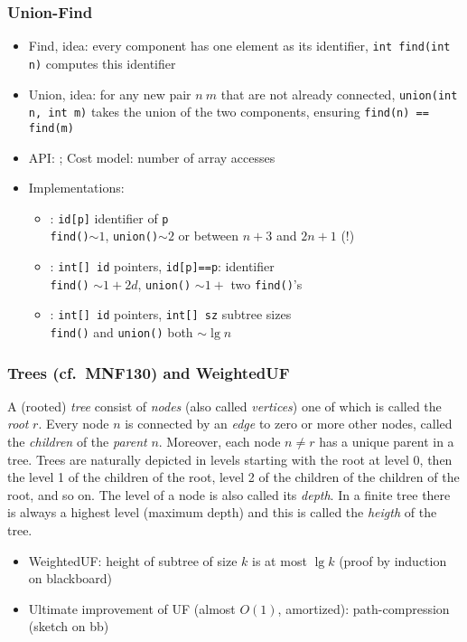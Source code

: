 \documentclass[handout]{beamer}
\newcommand{\git}{https://github.com/marcbezem/INF102/blob/master}
\begin{document}
\frame
  {
    
    \frametitle{Union-Find}

\begin{itemize}[<+->]
\item Find, idea: every component has one element as its identifier, 
 {\tt int  find(int n)} computes this identifier
\item Union, idea: for any new pair $n~m$ that are not already connected, 
{\tt union(int n, int m)} takes the union of the two components, ensuring
{\tt find(n) == find(m)}
\item API: \href{http://algs4.cs.princeton.edu/code/javadoc}{{\color{red}{UF}}};
Cost model: number of array accesses
\item Implementations:
  \begin{itemize}
  \item \href{\git/programs/fundamentals/unionFind/SlowUF.java}%
{\color{red}{SlowUF.java}}: {\tt id[p]} identifier of {\tt p}\\
{\tt find()}$\sim1$, {\tt union()}$\sim 2$ or between $n{+}3$ and $2n{+}1$ (!)
  \item \href{\git/programs/fundamentals/unionFind/FastUF.java}%
{\color{red}{FastUF.java}}: {\tt int[] id} pointers, {\tt id[p]==p}:  identifier\\
{\tt find()}  $\sim 1{+}2d$, {\tt union()} $\sim 1{+}$ two {\tt find()}'s
  \item \href{\git/programs/fundamentals/unionFind/WeightedUF.java}%
{\color{red}{WeightedUF.java}}: {\tt int[] id} pointers, {\tt int[] sz} subtree sizes\\
{\tt find()} and {\tt union()} both $\sim \lg n$
  \end{itemize}
\end{itemize}  
}

\frame
  {
    
    \frametitle{Trees (cf.\ MNF130) and WeightedUF}
A (rooted) \emph{tree} consist of \emph{nodes} (also called \emph{vertices})
one of which is called the \emph{root} $r$. 
Every node $n$ is connected by an \emph{edge} to zero 
or more other nodes, called the \emph{children} of the \emph{parent }$n$.
Moreover, each node $n\neq r$ has a unique parent in a tree.
Trees are naturally depicted in levels starting with the root at level 0,
then the level 1 of the children of the root, level 2 of the children
of the children of the root, and so on. The level of a node is also called its
\emph{depth}. In a finite tree there is always a highest level (maximum depth)
and this is called the \emph{heigth} of the tree.
\begin{itemize}[<+->]
\item WeightedUF: height of subtree of size $k$ is  at most $\lg k$ 
(proof by induction on blackboard)
\item Ultimate improvement of UF (almost $O(1)$, amortized): 
path-compression (sketch on bb)
\end{itemize} 
}
\end{document}
